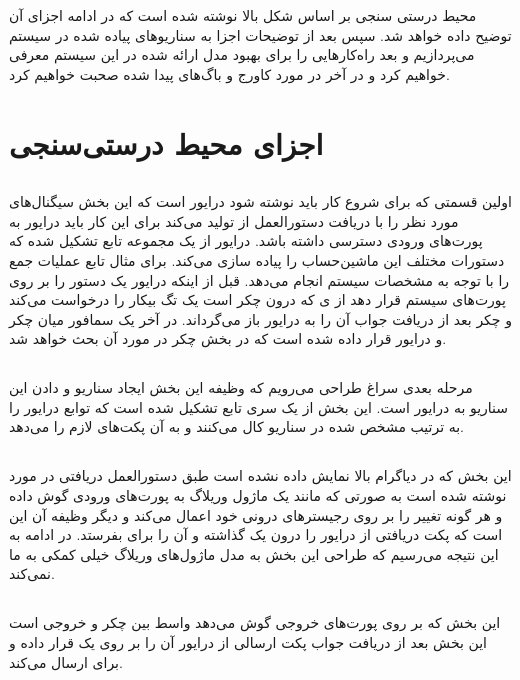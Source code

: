 \documentclass[a4paper, 11pt]{article}
\begin{document}
محیط درستی سنجی بر اساس شکل بالا نوشته شده است که در ادامه اجزای آن توضیح داده خواهد شد.
سپس بعد از توضیحات اجزا به سناریو‌های پیاده شده در سیستم می‌پردازیم و بعد راه‌کار‌هایی
را برای بهبود مدل ارائه شده در این سیستم معرفی خواهیم کرد و در آخر در مورد کاورج و
باگ‌های پیدا شده صحبت خواهیم‌ کرد.
\section{اجزای محیط درستی‌سنجی}
\subsection{}
اولین قسمتی که برای شروع کار باید نوشته شود درایور است که این بخش سیگنال‌های مورد نظر را
با دریافت دستورالعمل از
تولید می‌کند
برای این کار باید درایور به پورت‌های ورودی دسترسی داشته باشد.
درایور از یک مجموعه تابع تشکیل شده که دستورات مختلف این ماشین‌حساب را پیاده سازی می‌کند.
برای مثال تابع
عملیات جمع را با توجه به مشخصات سیستم‌ انجام می‌دهد.
قبل از اینکه درایور یک دستور را بر روی پورت‌های سیستم قرار دهد از
ی که درون چکر است یک تگ بیکار را درخواست می‌کند و چکر بعد از دریافت جواب آن را به درایور
باز می‌گرداند.
در آخر یک سمافور میان چکر و درایور قرار داده شده است که در بخش چکر در مورد آن بحث خواهد شد.
\subsection{}
مرحله بعدی سراغ طراحی
می‌رویم که وظیفه این بخش ایجاد سناریو و دادن این سناریو به درایور است.
این بخش از یک سری تابع تشکیل شده است که توابع درایور را به ترتیب مشخص شده در سناریو
کال می‌کنند و به آن پکت‌های لازم را می‌دهد.
\subsection{}
این بخش که در دیاگرام بالا نمایش داده نشده است طبق دستورالعمل دریافتی در مورد
نوشته شده است به صورتی که مانند یک ماژول وریلاگ به پورت‌های ورودی گوش داده
و هر گونه تغییر را بر روی رجیستر‌های درونی خود اعمال می‌کند و دیگر وظیفه آن این است که پکت دریافتی
از درایور را درون یک
گذاشته و آن را برای
بفرستد.
در ادامه به این نتیجه می‌رسیم که طراحی این بخش به مدل ماژول‌های وریلاگ خیلی کمکی به ما نمی‌کند.
\subsection{}
این بخش که بر روی پورت‌های خروجی گوش می‌دهد واسط بین چکر و خروجی است
این بخش بعد از دریافت جواب پکت ارسالی از درایور آن را بر روی یک
قرار داده و برای
ارسال می‌کند.
\end{document}
